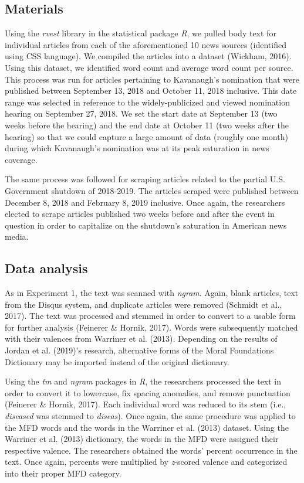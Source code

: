 \documentclass[english,,man]{apa6}
\begin{document}
\hypertarget{materials-1}{%
\subsection{Materials}\label{materials-1}}

Using the \emph{rvest} library in the statistical package \emph{R}, we pulled body text for individual articles from each of the aforementioned 10 news sources (identified using CSS language). We compiled the articles into a dataset (Wickham, 2016). Using this dataset, we identified word count and average word count per source. This process was run for articles pertaining to Kavanaugh's nomination that were published between September 13, 2018 and October 11, 2018 inclusive. This date range was selected in reference to the widely-publicized and viewed nomination hearing on September 27, 2018. We set the start date at September 13 (two weeks before the hearing) and the end date at October 11 (two weeks after the hearing) so that we could capture a large amount of data (roughly one month) during which Kavanaugh's nomination was at its peak saturation in news coverage.

The same process was followed for scraping articles related to the partial U.S. Government shutdown of 2018-2019. The articles scraped were published between December 8, 2018 and February 8, 2019 inclusive. Once again, the researchers elected to scrape articles published two weeks before and after the event in question in order to capitalize on the shutdown's saturation in American news media.

\hypertarget{data-analysis-1}{%
\subsection{Data analysis}\label{data-analysis-1}}

As in Experiment 1, the text was scanned with \emph{ngram}. Again, blank articles, text from the Disqus system, and duplicate articles were removed (Schmidt et al., 2017). The text was processed and stemmed in order to convert to a usable form for further analysis (Feinerer \& Hornik, 2017). Words were subsequently matched with their valences from Warriner et al. (2013). Depending on the results of Jordan et al. (2019)'s research, alternative forms of the Moral Foundations Dictionary may be imported instead of the original dictionary.

Using the \emph{tm} and \emph{ngram} packages in \emph{R}, the researchers processed the text in order to convert it to lowercase, fix spacing anomalies, and remove punctuation (Feinerer \& Hornik, 2017). Each individual word was reduced to its stem (i.e., \emph{diseased} was stemmed to \emph{diseas}). Once again, the same procedure was applied to the MFD words and the words in the Warriner et al. (2013) dataset. Using the Warriner et al. (2013) dictionary, the words in the MFD were assigned their respective valence. The researchers obtained the words' percent occurrence in the text. Once again, percents were multiplied by \emph{z}-scored valence and categorized into their proper MFD category.
\end{document}
